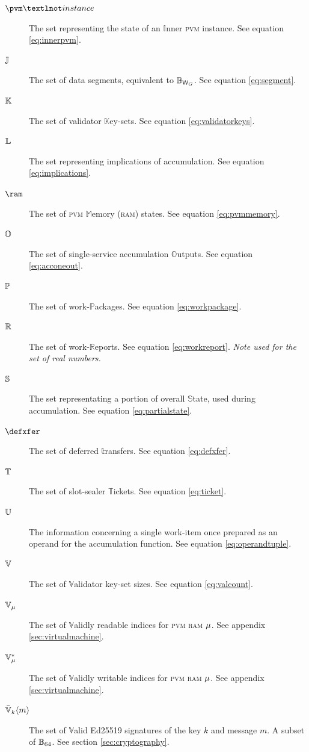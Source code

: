 \begin{description}
  \item[$\pvm¬instance$] The set representing the state of an $\mathbb{I}$nner \textsc{pvm} instance. See equation \ref{eq:innerpvm}.
  \item[$\segment$] The set of data segments, equivalent to $\blob[\Csegmentsize]$. See equation \ref{eq:segment}.
  \item[$\valkey$] The set of validator $\mathbb{K}$ey-sets. See equation \ref{eq:validatorkeys}.
  \item[$\implications$] The set representing implications of accumulation. See equation \ref{eq:implications}.
  \item[$\ram$] The set of \textsc{pvm} $\mathbb{M}$emory (\textsc{ram}) states. See equation \ref{eq:pvmmemory}.
  \item[$\acconeout$] The set of single-service accumulation $\mathbb{O}$utputs. See equation \ref{eq:acconeout}.
  \item[$\workpackage$] The set of work-$\mathbb{P}$ackages. See equation \ref{eq:workpackage}.
  \item[$\workreport$] The set of work-$\mathbb{R}$eports. See equation \ref{eq:workreport}. \emph{Note used for the set of real numbers.}
  \item[$\partialstate$] The set representating a portion of overall $\mathbb{S}$tate, used during accumulation. See equation \ref{eq:partialstate}.
  \item[$\defxfer$] The set of deferred $\mathbb{t}$ransfers. See equation \ref{eq:defxfer}.
  \item[$\safroleticket$] The set of slot-sealer $\mathbb{T}$ickets. See equation \ref{eq:ticket}.
  \item[$\operandtuple$] The information concerning a single work-item once prepared as an operand for the accumulation function. See equation \ref{eq:operandtuple}.
  \item[$\valcount$] The set of $\mathbb{V}$alidator key-set sizes. See equation \ref{eq:valcount}.
  \item[$\readable{\memory}$] The set of $\mathbb{V}$alidly readable indices for \textsc{pvm} \textsc{ram} $\memory$. See appendix \ref{sec:virtualmachine}.
  \item[$\writable{\memory}$] The set of $\mathbb{V}$alidly writable indices for \textsc{pvm} \textsc{ram} $\memory$. See appendix \ref{sec:virtualmachine}.
  \item[$\edsignature{k}{m}$] The set of $\mathbb{V}$alid Ed25519 signatures of the key $k$ and message $m$. A subset of $\blob[64]$. See section \ref{sec:cryptography}.

\end{description}
